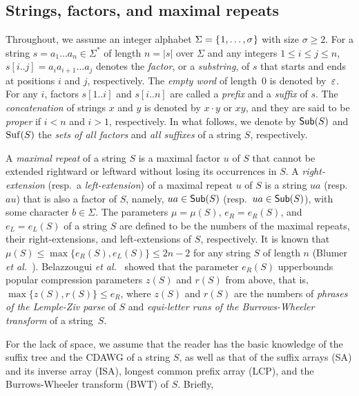 \documentclass{article}
\begin{document}
\subsection{Strings, factors, and maximal repeats}

Throughout, we assume an integer alphabet $\Sigma = \{\kern0.05em1, \dots, \sigma\kern0.05em\}$ with size $\sigma \ge 2$. 
For a string $s = a_1\dots a_n \in \Sigma^*$ of length $n = |s|$ over $\Sigma$ and any integers $1\le i\le j\le n$, $s[i..j] = a_i a_{i+1}\dots a_j$ denotes the \textit{factor}, or a \textit{substring}, of $s$ that starts and ends at positions $i$ and $j$, respectively. The \textit{empty word} of length~$0$ is denoted by~$\varepsilon$. For any $i$, factors $s[1..i]$ and $s[i..n]$ are called a \textit{prefix} and a \textit{suffix} of $s$. The \textit{concatenation} of strings $x$ and $y$ is denoted by $x\cdot y$ or $xy$, and they are said to be \textit{proper} if $i < n$ and $i > 1$, respectively. 
In what follows, we denote by $\mathsf{Sub}(S)$ and $\mathrm{Suf}(S)$ the \textit{sets of all factors} and \textit{all suffixes} of a string $S$, respectively. 

A \textit{maximal repeat} of a string $S$ is a maximal factor $u$ of $S$ that cannot be extended rightward or leftward without losing its occurrences in $S$. A \textit{right-extension} (resp.~a \textit{left-extension}) of a maximal repeat $u$ of $S$ is a string $ua$ (resp.~$au$) that is also a factor of $S$, namely, $ua \in \mathsf{Sub}(S)$ (resp.~$ua \in \mathsf{Sub}(S)$), with some character $b \in \Sigma$.
The parameters $\mu = \mu(S)$, $e_R = e_R(S)$, and $e_L = e_L(S)$ of a string $S$ are defined to be the numbers of the maximal repeats, their right-extensions, and left-extensions of $S$, respectively. It is known that $\mu(S) \le \max\{e_R(S), e_L(S)\} \le 2n - 2$ for any string $S$ of length $n$ (Blumer \textit{et al.}~\cite{blumer1987complete}).
Belazzougui \textit{et al.}~\cite{belazzougui:nunial:gagie:prezza:raffinot2015composite} showed that the parameter $e_R(S)$ upperbounds popular compression parameters $z(S)$ and $r(S)$ from above, that is, $\max\{z(S), r(S)\} \le e_R$, where $z(S)$ and $r(S)$ are the numbers of \textit{phrases of the Lemple-Ziv parse} of $S$ and \textit{equi-letter runs of the Burrows-Wheeler transform} of a string~$S$. 

For the lack of space, we assume that the reader has the basic knowledge of the suffix tree and the CDAWG of a string $S$, as well as that of the suffix arrays (SA) and its inverse array (ISA), longest common prefix array (LCP), and the Burrows-Wheeler transform (BWT) of $S$. Briefly, 
\end{document}
